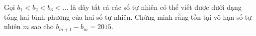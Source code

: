 \ifshowproblem
\begin{problem}\label{example:IRN-2015-TST1-P3}
    Gọi \( b_1 < b_2 < b_3 < \dots \) là dãy tất cả các số tự nhiên có thể viết được dưới dạng tổng hai bình phương của hai số tự nhiên.
    Chứng minh rằng tồn tại vô hạn số tự nhiên \( m \) sao cho \( b_{m+1} - b_m = 2015 \).
\end{problem}
\fi

\footnotemark
{}
\fi